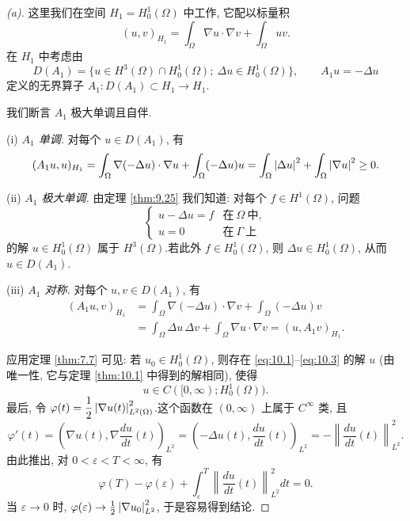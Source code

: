 \begin{proof}[(a)]
这里我们在空间 $H_1=H_0^1(\Omega)$ 中工作, 它配以标量积
\begin{equation*}
(u,v)_{H_1}=\int_\Omega\nabla u\cdot\nabla v+\int_\Omega uv.
\end{equation*}
在 $H_1$ 中考虑由
\begin{equation*}
D(A_1)=\{u\in H^3(\Omega)\cap H_0^1(\Omega);\ \Delta u\in H_0^1(\Omega)\},
\qquad A_1u=-\Delta u
\end{equation*}
定义的无界算子 $A_1:D(A_1)\subset H_1\to H_1$.

我们断言 $A_1$ 极大单调且自伴.

(i) \emph{$A_1$ 单调.} 对每个 $u\in D(A_1)$, 有
\begin{equation*}
(A_1u,u)_{H_1}=\int_\Omega\nabla(-\Delta u)\cdot\nabla u
+\int_\Omega(-\Delta u)u
=\int_\Omega\left|\Delta u\right|^2+\int_\Omega\left|\nabla u\right|^2\ge0.
\end{equation*}

(ii) \emph{$A_1$ 极大单调.} 由定理  \ref{thm:9.25} 我们知道: 对每个
$f\in H^1(\Omega)$, 问题
\begin{equation*}
\begin{cases}
u-\Delta u=f & \text{在}\ \Omega\ \text{中},\\
u=0 & \text{在}\ \Gamma\ \text{上}
\end{cases}
\end{equation*}
的解 $u\in H_0^1(\Omega)$ 属于 $H^3(\Omega)$.若此外 $f\in H_0^1(\Omega)$,
则 $\Delta u\in H_0^1(\Omega)$, 从而 $u\in D(A_1)$.

(iii) \emph{$A_1$ 对称.} 对每个 $u,v\in D(A_1)$, 有
\begin{align*}
(A_1u,v)_{H_1}
&=\int_\Omega\nabla(-\Delta u)\cdot\nabla v+\int_\Omega(-\Delta u)v\\
&=\int_\Omega\Delta u\,\Delta v+\int_\Omega\nabla u\cdot\nabla v
=(u,A_1v)_{H_1}.
\end{align*}

应用定理  \ref{thm:7.7} 可见: 若 $u_0\in H_0^1(\Omega)$, 则存在
\eqref{eq:10.1}--\eqref{eq:10.3} 的解 $u$ (由唯一性, 它与定理
 \ref{thm:10.1} 中得到的解相同), 使得
\begin{equation*}
u\in C([0,\infty);H_0^1(\Omega)).
\end{equation*}
最后, 令 $\varphi(t)=\dfrac12\left|\nabla u(t)\right|^2_{L^2(\Omega)}$.这个函数在
$(0,\infty)$ 上属于 $C^\infty$ 类, 且
\begin{equation*}
\varphi'(t)=\left(\nabla u(t),\nabla\frac{du}{dt}(t)\right)_{L^2}
=\left(-\Delta u(t),\frac{du}{dt}(t)\right)_{L^2}
=-\left\|\frac{du}{dt}(t)\right\|^2_{L^2}.
\end{equation*}
由此推出, 对 $0<\varepsilon<T<\infty$, 有
\begin{equation*}
\varphi(T)-\varphi(\varepsilon)
+\int_\varepsilon^T\left\|\frac{du}{dt}(t)\right\|^2_{L^2}dt=0.
\end{equation*}
当 $\varepsilon\to0$ 时,
$\varphi(\varepsilon)\to\frac12\left|\nabla u_0\right|^2_{L^2}$, 于是容易得到结论.
\end{proof}

